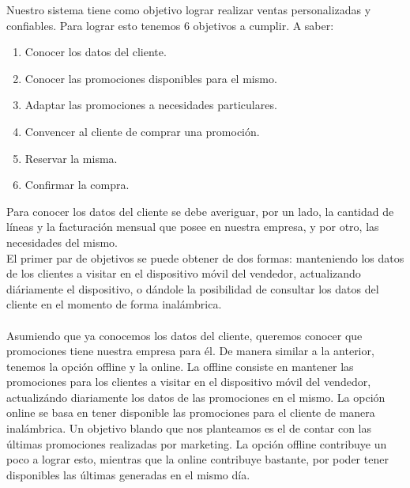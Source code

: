 Nuestro sistema tiene como objetivo lograr realizar ventas personalizadas y confiables. Para lograr esto tenemos 6 objetivos a cumplir. A saber:
\begin{enumerate}
  \item Conocer los datos del cliente.
  \item Conocer las promociones disponibles para el mismo.
  \item Adaptar las promociones a necesidades particulares.
  \item Convencer al cliente de comprar una promoción.
  \item Reservar la misma.
  \item Confirmar la compra.
\end{enumerate}
\indent Para conocer los datos del cliente se debe averiguar, por un lado, la cantidad de líneas y la facturación mensual que posee en nuestra empresa, y por otro, las necesidades del mismo.\\
\indent El primer par de objetivos se puede obtener de dos formas: manteniendo los datos de los clientes a visitar en el dispositivo móvil del vendedor, actualizando diáriamente el dispositivo, o dándole la posibilidad de consultar los datos del cliente en el momento de forma inalámbrica.\\
\\
\indent Asumiendo que ya conocemos los datos del cliente, queremos conocer que promociones tiene nuestra empresa para él. De manera similar a la anterior, tenemos la opción offline y la online. La offline consiste en mantener las promociones para los clientes a visitar en el dispositivo móvil del vendedor, actualizándo diariamente los datos de las promociones en el mismo. La opción online se basa en tener disponible las promociones para el cliente de manera inalámbrica. Un objetivo blando que nos planteamos es el de contar con las últimas promociones realizadas por marketing. La opción offline contribuye un poco a lograr esto, mientras que la online contribuye bastante, por poder tener disponibles las últimas generadas en el mismo día.\\
\\


